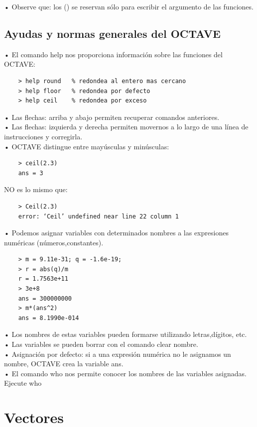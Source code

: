 \documentclass[a4,12pt]{article}
\begin{document}
• Observe que: los () se reservan sólo para escribir el argumento de las funciones.\\

\subsection{Ayudas y normas generales del OCTAVE}

• El comando help nos proporciona información sobre las funciones del OCTAVE:\\
\begin{verbatim}
    > help round   % redondea al entero mas cercano
    > help floor   % redondea por defecto
    > help ceil    % redondea por exceso
\end{verbatim}
• Las flechas: arriba y abajo permiten recuperar comandos anteriores.\\
• Las flechas: izquierda y derecha permiten movernos a lo largo de una línea de instrucciones y corregirla.\\
• OCTAVE distingue entre mayúsculas y minúsculas:\\
\begin{verbatim}
    > ceil(2.3)
    ans = 3
\end{verbatim}
NO es lo mismo que:\\
\begin{verbatim}
    > Ceil(2.3)
    error: ‘Ceil’ undefined near line 22 column 1
\end{verbatim}
• Podemos asignar variables con determinados nombres a las expresiones numéricas (números,constantes).\\
\begin{verbatim}
    > m = 9.11e-31; q = -1.6e-19;
    > r = abs(q)/m
    r = 1.7563e+11
    > 3e+8
    ans = 300000000
    > m*(ans^2)
    ans = 8.1990e-014
\end{verbatim}
• Los nombres de estas variables pueden formarse utilizando letras,dígitos, etc.\\
• Las variables se pueden borrar con el comando clear nombre.\\
• Asignación por defecto: si a una expresión numérica no le asignamos un nombre, OCTAVE crea la variable ans.\\
• El comando who nos permite conocer los nombres de las variables asignadas. Ejecute who\\

\section{Vectores}
\end{document}
